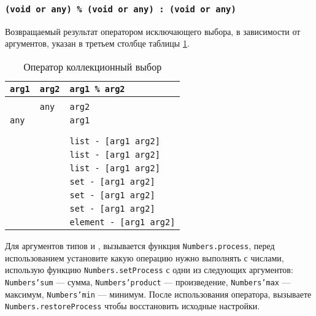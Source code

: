 \subsubsection{\texttt{(void or any) \% (void or any) : (void or any)}}

Возвращаемый результат оператором исключающего выбора, в зависимости от аргументов, указан в третьем столбце таблицы \ref{centhacktable}.

\begin{table}[htb]
	\caption{Оператор коллекционный выбор}
	\label{centhacktable}
	\begin{tabular}{|l|l|l|}
		\hline
		\texttt{arg1} & \texttt{arg2} & \texttt{arg1 \% arg2}			\\ \hline
		\void{}     & \void{}     & \void{}						\\ \hline
		\void{}     & \texttt{any}  & \texttt{arg2}					\\ \hline
		\texttt{any}  & \void{}     & \texttt{arg1}					\\ \hline
		\integer{}  & \integer{}  & \integer{}					\\ \hline
		\double{}   & \double{}   & \double{}					\\ \hline
		\str{}      & \str{}      & \texttt{list - [arg1 arg2]}	\\ \hline
		\listtype{} & \str{}      & \texttt{list - [arg1 arg2]}	\\ \hline
		\listtype{} & \listtype{} & \texttt{list - [arg1 arg2]}	\\ \hline
		\object{}   & \object{}   & \texttt{set - [arg1 arg2]}	\\ \hline
		\set{}      & \object{}   & \texttt{set - [arg1 arg2]}	\\ \hline
		\set{}      & \set{}      & \texttt{set - [arg1 arg2]}	\\ \hline
		\element{}  & \element{}  & \texttt{element - [arg1 arg2]}\\ \hline
	\end{tabular}
	\vspace{0em}
\end{table}

Для аргументов типов \integer{} и \double{}, вызывается функция \texttt{Numbers.process}, перед использованием установите какую операцию нужно выполнять с числами, использую функцию \texttt{Numbers.setProcess} с одни из следующих аргументов: \texttt{Numbers'sum} — сумма, \texttt{Numbers'product} — произведение, \texttt{Numbers'max} — максимум, \texttt{Numbers'min} — минимум. После использования оператора, вызываете \texttt{Numbers.restoreProcess} чтобы восстановить исходные настройки.

